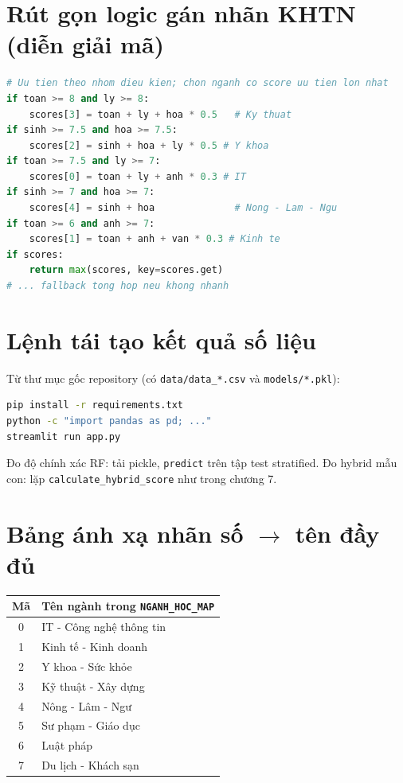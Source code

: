 \section{Rút gọn logic gán nhãn KHTN (diễn giải mã)}
\begin{lstlisting}[language=Python]
# Uu tien theo nhom dieu kien; chon nganh co score uu tien lon nhat
if toan >= 8 and ly >= 8:
    scores[3] = toan + ly + hoa * 0.5   # Ky thuat
if sinh >= 7.5 and hoa >= 7.5:
    scores[2] = sinh + hoa + ly * 0.5 # Y khoa
if toan >= 7.5 and ly >= 7:
    scores[0] = toan + ly + anh * 0.3 # IT
if sinh >= 7 and hoa >= 7:
    scores[4] = sinh + hoa              # Nong - Lam - Ngu
if toan >= 6 and anh >= 7:
    scores[1] = toan + anh + van * 0.3 # Kinh te
if scores:
    return max(scores, key=scores.get)
# ... fallback tong hop neu khong nhanh
\end{lstlisting}

\section{Lệnh tái tạo kết quả số liệu}
Từ thư mục gốc repository (có \texttt{data/data\_*.csv} và \texttt{models/*.pkl}):
\begin{lstlisting}[language=bash]
pip install -r requirements.txt
python -c "import pandas as pd; ..."
streamlit run app.py
\end{lstlisting}
Đo độ chính xác RF: tải pickle, \texttt{predict} trên tập test stratified. Đo hybrid mẫu con: lặp \texttt{calculate\_hybrid\_score} như trong chương 7.

\section{Bảng ánh xạ nhãn số $\rightarrow$ tên đầy đủ}
\begin{table}[htbp]
\centering
\begin{tabular}{cl}
\toprule
Mã & Tên ngành trong \texttt{NGANH\_HOC\_MAP} \\
\midrule
0 & IT - Công nghệ thông tin \\
1 & Kinh tế - Kinh doanh \\
2 & Y khoa - Sức khỏe \\
3 & Kỹ thuật - Xây dựng \\
4 & Nông - Lâm - Ngư \\
5 & Sư phạm - Giáo dục \\
6 & Luật pháp \\
7 & Du lịch - Khách sạn \\
\bottomrule
\end{tabular}
\end{table}

